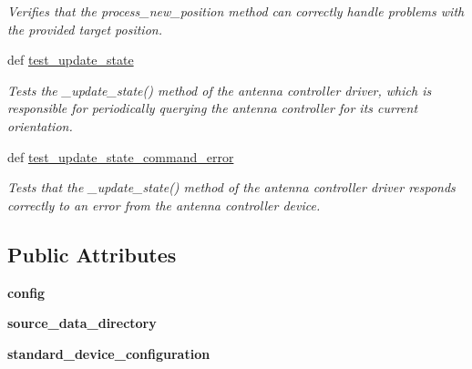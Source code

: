 \begin{DoxyCompactItemize}
\begin{DoxyCompactList}\small\item\em Verifies that the process\-\_\-new\-\_\-position method can correctly handle problems with the provided target position. \end{DoxyCompactList}\item 
def \hyperlink{classhwm_1_1hardware_1_1devices_1_1drivers_1_1mxl__antenna__controller_1_1tests_1_1test__mxl__an2edaee9f18a9d6c35832076cf9ff4beb_ace1b2aebea3949b12e816ef79fc623fb}{test\-\_\-update\-\_\-state}
\begin{DoxyCompactList}\small\item\em Tests the \-\_\-update\-\_\-state() method of the antenna controller driver, which is responsible for periodically querying the antenna controller for its current orientation. \end{DoxyCompactList}\item 
def \hyperlink{classhwm_1_1hardware_1_1devices_1_1drivers_1_1mxl__antenna__controller_1_1tests_1_1test__mxl__an2edaee9f18a9d6c35832076cf9ff4beb_a83a864df3d718e994b899353c784dfe6}{test\-\_\-update\-\_\-state\-\_\-command\-\_\-error}
\begin{DoxyCompactList}\small\item\em Tests that the \-\_\-update\-\_\-state() method of the antenna controller driver responds correctly to an error from the antenna controller device. \end{DoxyCompactList}\end{DoxyCompactItemize}
\subsection*{Public Attributes}
\begin{DoxyCompactItemize}
\item 
\hypertarget{classhwm_1_1hardware_1_1devices_1_1drivers_1_1mxl__antenna__controller_1_1tests_1_1test__mxl__an2edaee9f18a9d6c35832076cf9ff4beb_a4483a6a51af6cb6bb9b27feaf0b0c160}{{\bfseries config}}\label{classhwm_1_1hardware_1_1devices_1_1drivers_1_1mxl__antenna__controller_1_1tests_1_1test__mxl__an2edaee9f18a9d6c35832076cf9ff4beb_a4483a6a51af6cb6bb9b27feaf0b0c160}

\item 
\hypertarget{classhwm_1_1hardware_1_1devices_1_1drivers_1_1mxl__antenna__controller_1_1tests_1_1test__mxl__an2edaee9f18a9d6c35832076cf9ff4beb_ae1f47b9755da9899f2a810253f96ed44}{{\bfseries source\-\_\-data\-\_\-directory}}\label{classhwm_1_1hardware_1_1devices_1_1drivers_1_1mxl__antenna__controller_1_1tests_1_1test__mxl__an2edaee9f18a9d6c35832076cf9ff4beb_ae1f47b9755da9899f2a810253f96ed44}

\item 
\hypertarget{classhwm_1_1hardware_1_1devices_1_1drivers_1_1mxl__antenna__controller_1_1tests_1_1test__mxl__an2edaee9f18a9d6c35832076cf9ff4beb_af67f34f13b2861d2d5ffb5bc6d6475bf}{{\bfseries standard\-\_\-device\-\_\-configuration}}\label{classhwm_1_1hardware_1_1devices_1_1drivers_1_1mxl__antenna__controller_1_1tests_1_1test__mxl__an2edaee9f18a9d6c35832076cf9ff4beb_af67f34f13b2861d2d5ffb5bc6d6475bf}

\end{DoxyCompactItemize}
